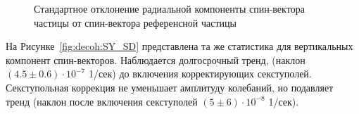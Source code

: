 \begin{figure}[H]
	\centering
	\caption{Стандартное отклонение радиальной компоненты спин-вектора частицы от спин-вектора референсной частицы\label{fig:decoh:SX_SD}}
\end{figure}

На Рисунке~\ref{fig:decoh:SY_SD} представлена та же статистика  для вертикальных компонент спин-векторов. Наблюдается долгосрочный тренд, 
(наклон $(4.5 \pm 0.6)\cdot 10^{-7}$ 1/сек) до включения корректирующих секступолей. Секступольная коррекция не уменьшает амплитуду колебаний, 
но подавляет тренд (наклон после включения секступолей $(5\pm 6)\cdot 10^{-8}$ 1/сек).

